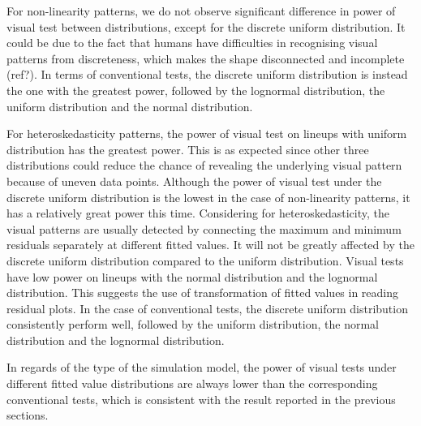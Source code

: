 \documentclass[]{interact}
\theoremstyle{plain}%
\theoremstyle{definition}
\theoremstyle{remark}
\begin{document}
For non-linearity patterns, we do not observe significant difference in
power of visual test between distributions, except for the discrete
uniform distribution. It could be due to the fact that humans have
difficulties in recognising visual patterns from discreteness, which
makes the shape disconnected and incomplete (ref?). In terms of
conventional tests, the discrete uniform distribution is instead the one
with the greatest power, followed by the lognormal distribution, the
uniform distribution and the normal distribution.

For heteroskedasticity patterns, the power of visual test on lineups
with uniform distribution has the greatest power. This is as expected
since other three distributions could reduce the chance of revealing the
underlying visual pattern because of uneven data points. Although the
power of visual test under the discrete uniform distribution is the
lowest in the case of non-linearity patterns, it has a relatively great
power this time. Considering for heteroskedasticity, the visual patterns
are usually detected by connecting the maximum and minimum residuals
separately at different fitted values. It will not be greatly affected
by the discrete uniform distribution compared to the uniform
distribution. Visual tests have low power on lineups with the normal
distribution and the lognormal distribution. This suggests the use of
transformation of fitted values in reading residual plots. In the case
of conventional tests, the discrete uniform distribution consistently
perform well, followed by the uniform distribution, the normal
distribution and the lognormal distribution.

In regards of the type of the simulation model, the power of visual
tests under different fitted value distributions are always lower than
the corresponding conventional tests, which is consistent with the
result reported in the previous sections.
\end{document}
